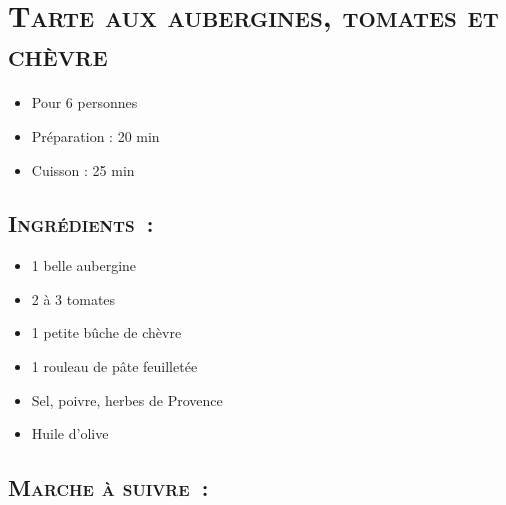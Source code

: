 \section[\normalsize{Tarte aux aubergines, tomates et ch\`evre}]{\LARGE{\textsc{Tarte aux aubergines, tomates et ch\`evre}}}		%


\begin{itemize}
\item Pour 6 personnes
\item Préparation : 20 min
\item Cuisson : 25 min
\end{itemize}

\subsection*{\textsc{Ingr\'edients~:}}

\begin{itemize}
\item 1 belle aubergine
\item 2 \`a 3 tomates
\item 1 petite bûche de ch\`evre
\item 1 rouleau de p\^ate feuillet\'ee
\item Sel, poivre, herbes de Provence
\item Huile d'olive
\end{itemize}


\subsection*{\textsc{Marche \`a suivre~:}}

